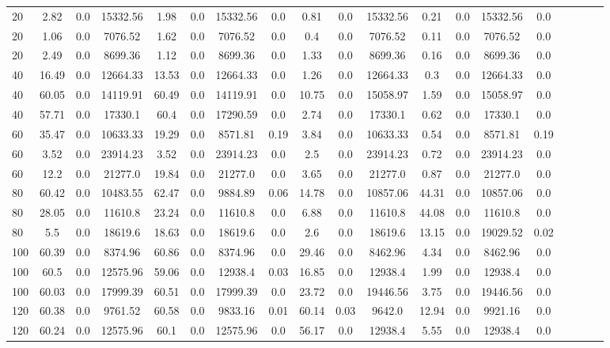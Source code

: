\begin{sidewaystable}[!h]
\begin{tabular}{lcccccccccccccccccc}
20 & 2.82 & 0.0 & 15332.56 & 1.98 & 0.0 & 15332.56 & 0.0 & 0.81 & 0.0 & 15332.56 & 0.21 & 0.0 & 15332.56 & 0.0 \\
20 & 1.06 & 0.0 & 7076.52 & 1.62 & 0.0 & 7076.52 & 0.0 & 0.4 & 0.0 & 7076.52 & 0.11 & 0.0 & 7076.52 & 0.0 \\
20 & 2.49 & 0.0 & 8699.36 & 1.12 & 0.0 & 8699.36 & 0.0 & 1.33 & 0.0 & 8699.36 & 0.16 & 0.0 & 8699.36 & 0.0 \\
40 & 16.49 & 0.0 & 12664.33 & 13.53 & 0.0 & 12664.33 & 0.0 & 1.26 & 0.0 & 12664.33 & 0.3 & 0.0 & 12664.33 & 0.0 \\
40 & 60.05 & 0.0 & 14119.91 & 60.49 & 0.0 & 14119.91 & 0.0 & 10.75 & 0.0 & 15058.97 & 1.59 & 0.0 & 15058.97 & 0.0 \\
40 & 57.71 & 0.0 & 17330.1 & 60.4 & 0.0 & 17290.59 & 0.0 & 2.74 & 0.0 & 17330.1 & 0.62 & 0.0 & 17330.1 & 0.0 \\
60 & 35.47 & 0.0 & 10633.33 & 19.29 & 0.0 & 8571.81 & 0.19 & 3.84 & 0.0 & 10633.33 & 0.54 & 0.0 & 8571.81 & 0.19 \\
60 & 3.52 & 0.0 & 23914.23 & 3.52 & 0.0 & 23914.23 & 0.0 & 2.5 & 0.0 & 23914.23 & 0.72 & 0.0 & 23914.23 & 0.0 \\
60 & 12.2 & 0.0 & 21277.0 & 19.84 & 0.0 & 21277.0 & 0.0 & 3.65 & 0.0 & 21277.0 & 0.87 & 0.0 & 21277.0 & 0.0 \\
80 & 60.42 & 0.0 & 10483.55 & 62.47 & 0.0 & 9884.89 & 0.06 & 14.78 & 0.0 & 10857.06 & 44.31 & 0.0 & 10857.06 & 0.0 \\
80 & 28.05 & 0.0 & 11610.8 & 23.24 & 0.0 & 11610.8 & 0.0 & 6.88 & 0.0 & 11610.8 & 44.08 & 0.0 & 11610.8 & 0.0 \\
80 & 5.5 & 0.0 & 18619.6 & 18.63 & 0.0 & 18619.6 & 0.0 & 2.6 & 0.0 & 18619.6 & 13.15 & 0.0 & 19029.52 & 0.02 \\
100 & 60.39 & 0.0 & 8374.96 & 60.86 & 0.0 & 8374.96 & 0.0 & 29.46 & 0.0 & 8462.96 & 4.34 & 0.0 & 8462.96 & 0.0 \\
100 & 60.5 & 0.0 & 12575.96 & 59.06 & 0.0 & 12938.4 & 0.03 & 16.85 & 0.0 & 12938.4 & 1.99 & 0.0 & 12938.4 & 0.0 \\
100 & 60.03 & 0.0 & 17999.39 & 60.51 & 0.0 & 17999.39 & 0.0 & 23.72 & 0.0 & 19446.56 & 3.75 & 0.0 & 19446.56 & 0.0 \\
120 & 60.38 & 0.0 & 9761.52 & 60.58 & 0.0 & 9833.16 & 0.01 & 60.14 & 0.03 & 9642.0 & 12.94 & 0.0 & 9921.16 & 0.0 \\
120 & 60.24 & 0.0 & 12575.96 & 60.1 & 0.0 & 12575.96 & 0.0 & 56.17 & 0.0 & 12938.4 & 5.55 & 0.0 & 12938.4 & 0.0 \\

\end{tabular}
\end{sidewaystable}
